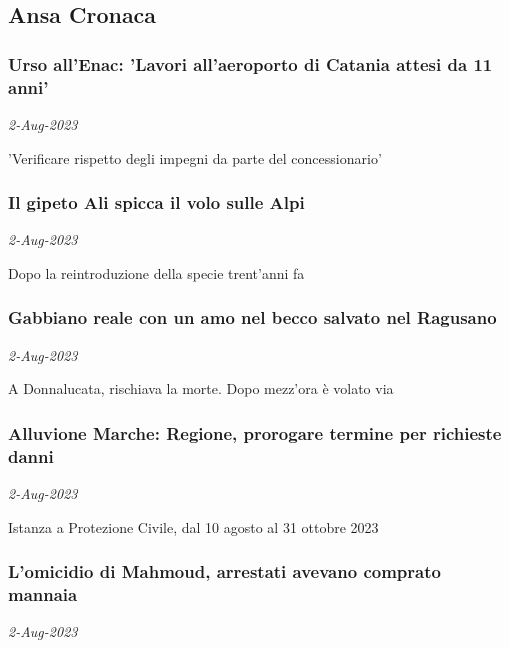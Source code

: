 \subsection{Ansa Cronaca \href{https://www.ansa.it/sito/notizie/cronaca/cronaca.shtml}{}}
\subsubsection{Urso all'Enac: 'Lavori all'aeroporto di Catania attesi da 11 anni' \href{https://www.ansa.it/sito/notizie/cronaca/2023/08/02/urso-allenac-lavori-allaeroporto-di-catania-attesi-da-11-anni_32265dc8-f6e1-4cb2-9fe2-912e292aef76.html}{}}
\textit{2-Aug-2023}

'Verificare rispetto degli impegni da parte del concessionario'
\subsubsection{Il gipeto Ali spicca il volo sulle Alpi \href{https://www.ansa.it/sito/notizie/cronaca/2023/08/02/il-gipeto-ali-spicca-il-volo-sulle-alpi_dfd71d59-2447-40ed-92c0-643962dcce20.html}{}}
\textit{2-Aug-2023}

Dopo la reintroduzione della specie trent'anni fa
\subsubsection{Gabbiano reale con un amo nel becco salvato nel Ragusano \href{https://www.ansa.it/sito/notizie/cronaca/2023/08/02/gabbiano-reale-con-un-amo-nel-becco-salvato-nel-ragusano_88b94c9f-c2c7-4917-aa70-b5cf919aacc6.html}{}}
\textit{2-Aug-2023}

A Donnalucata, rischiava la morte. Dopo mezz'ora \`{e} volato via
\subsubsection{Alluvione Marche: Regione, prorogare termine per richieste danni \href{https://www.ansa.it/sito/notizie/cronaca/2023/08/02/alluvione-marche-regione-prorogare-termine-per-richieste-danni_b8888fbf-aeec-48b3-bfa2-4d81f73fe646.html}{}}
\textit{2-Aug-2023}

Istanza a Protezione Civile, dal 10 agosto al 31 ottobre 2023
\subsubsection{L'omicidio di Mahmoud, arrestati avevano comprato mannaia \href{https://www.ansa.it/sito/notizie/cronaca/2023/08/02/lomicidio-di-mahmoud-arrestati-avevano-comprato-mannaia_0741ccd2-6640-40f0-9093-8cbd251c01b7.html}{}}
\textit{2-Aug-2023}

